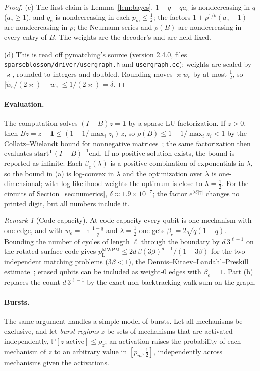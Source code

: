 \documentclass[11pt]{article}
\theoremstyle{plain}
\theoremstyle{definition}
\theoremstyle{remark}
\newtheorem{remark}{Remark}
\newcommand{\Prob}{\mathbb{P}}
\newcommand{\pM}{p_{\mathrm{L}}^{\mathrm{MWPM}}}
\newcommand{\tw}{\tilde w}
\newcommand{\one}{\mathbf 1}
\newcommand{\tsc}[1]{\texttt{#1}}
\renewcommand{\_}{\oldunderscore\allowbreak}
\newcommand{\sla}{/\allowbreak}
\begin{document}
\begin{proof}
(c) The first claim is Lemma~\ref{lem:bayes}. $1-q+qa_e$ is nondecreasing in $q$ ($a_e\ge1$), and $q_e$ is nondecreasing in each $p_m\le\tfrac12$; the factors $1+p^{1/k}(a_e-1)$ are nondecreasing in $p$; the Neumann series and $\rho(B)$ are nondecreasing in every entry of $B$. The weights are the decoder's and are held fixed.

(d) This is read off pymatching's source (version 2.4.0, files \tsc{sparse\_blossom\sla driver\sla user\_graph.h} and \tsc{user\_graph.cc}): weights are scaled by $\varkappa$, rounded to integers and doubled. Rounding moves $\varkappa w_e$ by at most $\tfrac12$, so $|\tw_e/(2\varkappa)-w_e|\le1/(2\varkappa)=\delta$.
\end{proof}

\paragraph{Evaluation.} The computation solves $(I-B)z=\one$ by a sparse LU factorization. If $z>0$, then $Bz=z-\one\le(1-1/\max_iz_i)\,z$, so $\rho(B)\le1-1/\max_iz_i<1$ by the Collatz--Wielandt bound for nonnegative matrices~\cite{HornJohnson}; the same factorization then evaluates $\mathrm{start}^{\mathsf T}(I-B)^{-1}\mathrm{end}$. If no positive solution exists, the bound is reported as infinite. Each $\beta_e(\lambda)$ is a positive combination of exponentials in $\lambda$, so the bound in (a) is log-convex in $\lambda$ and the optimization over $\lambda$ is one-dimensional; with log-likelihood weights the optimum is close to $\lambda=\tfrac12$. For the circuits of Section~\ref{sec:numerics}, $\delta\approx1.9\times10^{-7}$; the factor $e^{\lambda\delta|\gamma|}$ changes no printed digit, but all numbers include it.

\begin{remark}[Code capacity]\label{rem:cc}
At code capacity every qubit is one mechanism with one edge, and with $w_e=\ln\frac{1-q}{q}$ and $\lambda=\tfrac12$ one gets $\beta_e=2\sqrt{q(1-q)}$. Bounding the number of cycles of length $\ell$ through the boundary by $d\,3^{\ell-1}$ on the rotated surface code gives $\pM\le 2d\,\beta(3\beta)^{d-1}/(1-3\beta)$ for the two independent matching problems ($3\beta<1$), the Dennis--Kitaev--Landahl--Preskill estimate~\cite{DKLP}; erased qubits can be included as weight-$0$ edges with $\beta_e=1$. Part (b) replaces the count $d\,3^{\ell-1}$ by the exact non-backtracking walk sum on the graph.
\end{remark}

\paragraph{Bursts.} The same argument handles a simple model of bursts. Let all mechanisms be exclusive, and let \emph{burst regions} $z$ be sets of mechanisms that are activated independently, $\Prob[z\text{ active}]\le\rho_z$; an activation raises the probability of each mechanism of $z$ to an arbitrary value in $[p_m,\tfrac12]$, independently across mechanisms given the activations.
\end{document}
